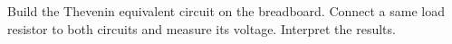 \documentclass[11pt]{article}
\begin{document}
\begin{question}
    \begin{subquestion}{Build the Thevenin equivalent circuit on the breadboard. Connect a same load resistor to both circuits and measure its voltage. Interpret the results.}
    \end{subquestion}

\end{question}


\end{document}

